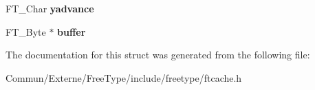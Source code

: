 \begin{DoxyCompactItemize}
\item 
F\+T\+\_\+\+Char {\bfseries yadvance}\hypertarget{struct_f_t_c___s_bit_rec___aabe767ddaf7ff62918886c6f62e9ac28}{}\label{struct_f_t_c___s_bit_rec___aabe767ddaf7ff62918886c6f62e9ac28}

\item 
F\+T\+\_\+\+Byte $\ast$ {\bfseries buffer}\hypertarget{struct_f_t_c___s_bit_rec___abe4d78fc3f411d67e7fc43f7aa21bd1d}{}\label{struct_f_t_c___s_bit_rec___abe4d78fc3f411d67e7fc43f7aa21bd1d}

\end{DoxyCompactItemize}


The documentation for this struct was generated from the following file\+:\begin{DoxyCompactItemize}
\item 
Commun/\+Externe/\+Free\+Type/include/freetype/ftcache.\+h\end{DoxyCompactItemize}
